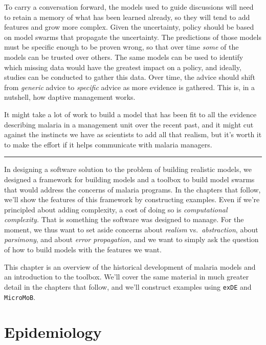 \documentclass[
]{book}
\begin{document}
To carry a conversation forward, the models used to guide discussions will need to retain a memory of what has been learned already, so they will tend to add features and grow more complex.
Given the uncertainty, policy should be based on model swarms that propagate the uncertainty.
The predictions of those models must be specific enough to be proven wrong, so that over time \emph{some} of the models can be trusted over others.
The same models can be used to identify which missing data would have the greatest impact on a policy, and ideally, studies can be conducted to gather this data.
Over time, the advice should shift from \emph{generic} advice to \emph{specific} advice as more evidence is gathered.
This is, in a nutshell, how daptive management works.

It might take a lot of work to build a model that has been fit to all the evidence describing malaria in a management unit over the recent past, and it might cut against the instincts we have as scientists to add all that realism, but it's worth it to make the effort if it helps communicate with malaria managers.

\begin{center}\rule{0.5\linewidth}{0.5pt}\end{center}

In designing a software solution to the problem of building realistic models, we designed a framework for building models and a toolbox to build model swarms that would address the concerns of malaria programs. In the chapters that follow, we'll show the features of this framework by constructing examples. Even if we're principled about adding complexity, a cost of doing so is \emph{computational complexity.} That is something the software was designed to manage. For the moment, we thus want to set aside concerns about \emph{realism} vs.~\emph{abstraction}, about \emph{parsimony}, and about \emph{error propagation,} and we want to simply ask the question of how to build models with the features we want.

This chapter is an overview of the historical development of malaria models and an introduction to the toolbox. We'll cover the same material in much greater detail in the chapters that follow, and we'll construct examples using \texttt{exDE} and \texttt{MicroMoB}.

\hypertarget{epidemiology}{%
\section{Epidemiology}\label{epidemiology}}
\end{document}
